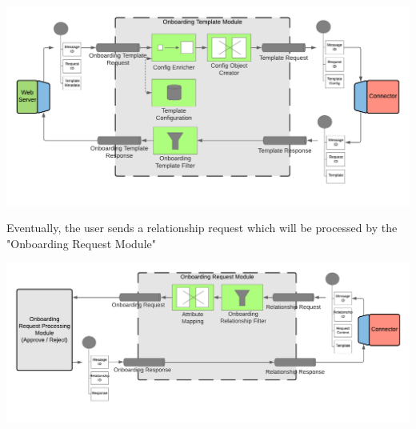 \begin{center}
    \includegraphics[scale=0.6]{Diagrams/Integration Architecture 1/Technological Integration/6. Onboarding Template Module.pdf}
\end{center}

Eventually, the user sends a relationship request which will be processed by the "Onboarding Request Module"

\begin{center}
    \includegraphics[scale=0.6]{Diagrams/Integration Architecture 1/Technological Integration/7. Onboarding Request Module.pdf}
\end{center}

